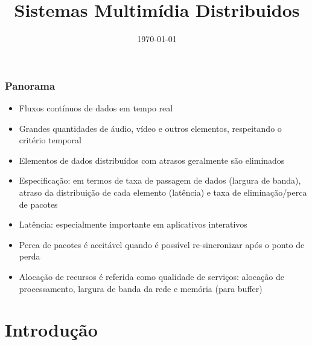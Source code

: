 \documentclass[]{beamer}
\title{Sistemas Multimídia Distribuidos}
\author{}
\institute{Baseado no cap. 17 do livro do Coulouris\cite{Coulouris:2007}}
\date{\today}
\begin{document}
\begin{frame}
  \titlepage
\end{frame}



\begin{frame}[allowframebreaks]
 \frametitle{Panorama}
 \begin{itemize}
   \item Fluxos contínuos de dados em tempo real
   \item Grandes quantidades de áudio, vídeo e outros elementos, respeitando o critério temporal
   \item Elementos de dados distribuídos com atrasos geralmente são eliminados
   \item Especificação: em termos de taxa de passagem de dados (largura de banda),
atraso da distribuição de cada elemento (latência) e taxa de eliminação/perca de pacotes
  \item Latência: especialmente importante em aplicativos interativos
  \item Perca de pacotes é aceitável quando é possível re-sincronizar após o ponto de perda
  \item Alocação de recursos é referida como qualidade de serviços: alocação de processamento,
largura de banda da rede e memória (para buffer)
\end{itemize}
\end{frame}


\section{Introdução}
\end{document}
